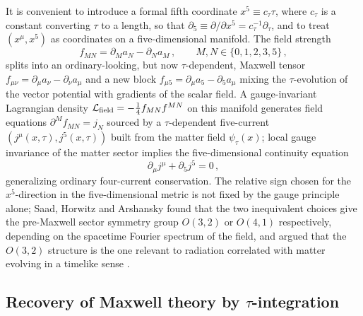 \documentclass[11pt]{article}
\begin{document}
It is convenient to introduce a formal fifth coordinate $x^5\equiv c_\tau\tau$,
where $c_\tau$ is a constant converting $\tau$ to a length, so that
$\partial_5\equiv \partial/\partial x^5=c_\tau^{-1}\partial_\tau$, and to treat
$(x^\mu,x^5)$ as coordinates on a five-dimensional manifold. The field strength
\begin{equation}
f_{MN}=\partial_M a_N-\partial_N a_M\,,\qquad M,N\in\{0,1,2,3,5\}\,,
\label{eq:fieldstrength5D}
\end{equation}
splits into an ordinary-looking, but now $\tau$-dependent, Maxwell tensor
$f_{\mu\nu}=\partial_\mu a_\nu-\partial_\nu a_\mu$ and a new block
$f_{\mu5}=\partial_\mu a_5-\partial_5 a_\mu$ mixing the $\tau$-evolution of the
vector potential with gradients of the scalar field. A gauge-invariant
Lagrangian density $\mathcal L_{\rm field}=-\tfrac14 f_{MN}f^{MN}$ on this
manifold generates field equations $\partial^M f_{MN}=j_N$ sourced by a
$\tau$-dependent five-current $(j^\mu(x,\tau),j^5(x,\tau))$ built from the
matter field $\psi_\tau(x)$; local gauge invariance of the matter sector
implies the five-dimensional continuity equation
\begin{equation}
\partial_\mu j^\mu+\partial_5 j^5=0\,,
\label{eq:5Dcontinuity}
\end{equation}
generalizing ordinary four-current conservation. The relative sign chosen for
the $x^5$-direction in the five-dimensional metric is not fixed by the gauge
principle alone; Saad, Horwitz and Arshansky found that the two inequivalent
choices give the pre-Maxwell sector symmetry group $O(3,2)$ or $O(4,1)$
respectively, depending on the spacetime Fourier spectrum of the field, and
argued that the $O(3,2)$ structure is the one relevant to radiation correlated
with matter evolving in a timelike sense \cite{SaadHorwitzArshansky1989}.

\subsection{Recovery of Maxwell theory by $\tau$-integration}
\end{document}
